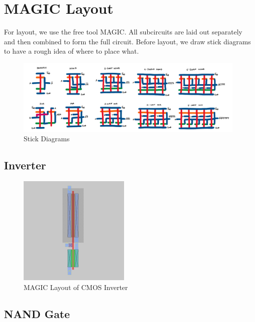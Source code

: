 \documentclass[conference]{IEEEtran}
\begin{document}
\section{MAGIC Layout}
For layout, we use the free tool MAGIC. All subcircuits are laid out separately and then combined to form the full circuit. Before layout, we draw stick diagrams to have a rough idea of where to place what.

\begin{figure}[t]
    \centering
    \includegraphics[width=1\textwidth]{images/stick_diagrams.png}
    \caption{Stick Diagrams}
\end{figure}

\subsection{Inverter}

\begin{figure}[H]
    \centering
    \includegraphics[width=0.48\textwidth]{images/inv_cmos_layout.png}
    \caption{MAGIC Layout of CMOS Inverter}
\end{figure}

\subsection{NAND Gate}
\end{document}
